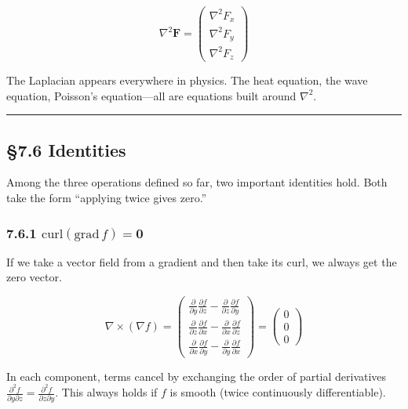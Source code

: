 \[\nabla^2 \mathbf{F} = \begin{pmatrix} \nabla^2 F_x \\ \nabla^2 F_y \\ \nabla^2 F_z \end{pmatrix}\]

The Laplacian appears everywhere in physics. The heat equation, the wave
equation, Poisson's equation---all are equations built around
\(\nabla^2\).

\begin{center}\rule{0.5\linewidth}{0.5pt}\end{center}

\hypertarget{identities}{%
\subsection{§7.6 Identities}\label{identities}}

Among the three operations defined so far, two important identities
hold. Both take the form ``applying twice gives zero.''

\hypertarget{mathrmcurlmathrmgradf-mathbf0}{%
\subsubsection{\texorpdfstring{7.6.1
\(\mathrm{curl}(\mathrm{grad}\,f) = \mathbf{0}\)}{7.6.1 \textbackslash mathrm\{curl\}(\textbackslash mathrm\{grad\}\textbackslash,f) = \textbackslash mathbf\{0\}}}\label{mathrmcurlmathrmgradf-mathbf0}}

If we take a vector field from a gradient and then take its curl, we
always get the zero vector.

\[\nabla \times (\nabla f) = \begin{pmatrix}
\frac{\partial}{\partial y}\frac{\partial f}{\partial z} - \frac{\partial}{\partial z}\frac{\partial f}{\partial y} \\[0.5em]
\frac{\partial}{\partial z}\frac{\partial f}{\partial x} - \frac{\partial}{\partial x}\frac{\partial f}{\partial z} \\[0.5em]
\frac{\partial}{\partial x}\frac{\partial f}{\partial y} - \frac{\partial}{\partial y}\frac{\partial f}{\partial x}
\end{pmatrix} = \begin{pmatrix} 0 \\ 0 \\ 0 \end{pmatrix}\]

In each component, terms cancel by exchanging the order of partial
derivatives
\(\frac{\partial^2 f}{\partial y\partial z} = \frac{\partial^2 f}{\partial z\partial y}\).
This always holds if \(f\) is smooth (twice continuously
differentiable).

